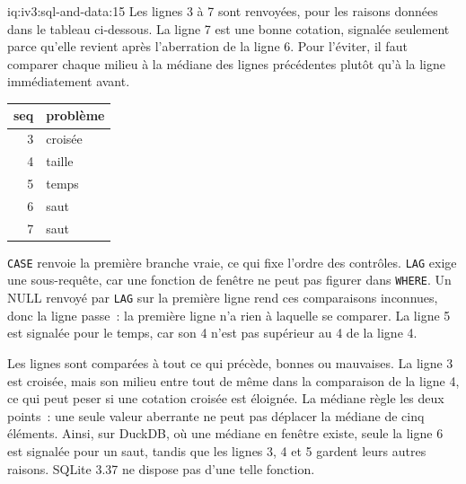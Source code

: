 \begin{solution}{iq:iv3:sql-and-data:15}
Les lignes 3 à 7 sont renvoyées, pour les raisons données dans le tableau ci-dessous. La ligne 7 est une bonne cotation, signalée seulement parce qu'elle revient après l'aberration de la ligne 6. Pour l'éviter, il faut comparer chaque milieu à la médiane des lignes précédentes plutôt qu'à la ligne immédiatement avant.
\enlargethispage{-3\baselineskip}%
\label{lst:iv3:sq:ticks}
\begin{center}\small
\begin{tabular}{rl}
seq & problème\\\hline
3 & croisée\\
4 & taille\\
5 & temps\\
6 & saut\\
7 & saut
\end{tabular}
\end{center}
\texttt{CASE} renvoie la première branche vraie, ce qui fixe l'ordre des contrôles. \texttt{LAG} exige une sous-requête, car une fonction de fenêtre ne peut pas figurer dans \texttt{WHERE}. Un NULL renvoyé par \texttt{LAG} sur la première ligne rend ces comparaisons inconnues, donc la ligne passe~: la première ligne n'a rien à laquelle se comparer. La ligne 5 est signalée pour le temps, car son 4 n'est pas supérieur au 4 de la ligne 4.

Les lignes sont comparées à tout ce qui précède, bonnes ou mauvaises. La ligne 3 est croisée, mais son milieu entre tout de même dans la comparaison de la ligne 4, ce qui peut peser si une cotation croisée est éloignée. La médiane règle les deux points~: une seule valeur aberrante ne peut pas déplacer la médiane de cinq éléments. Ainsi, sur DuckDB, où une médiane en fenêtre existe, seule la ligne 6 est signalée pour un saut, tandis que les lignes 3, 4 et 5 gardent leurs autres raisons. SQLite 3.37 ne dispose pas d'une telle fonction.

\end{solution}

